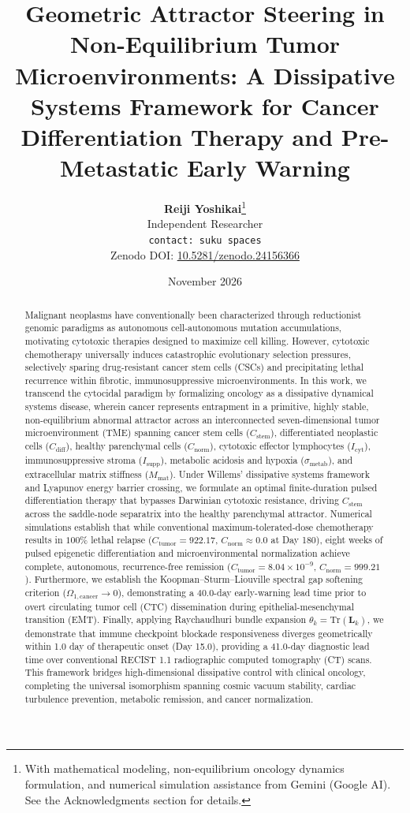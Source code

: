 \documentclass[11pt,a4paper]{article}
\title{\textbf{Geometric Attractor Steering in Non-Equilibrium Tumor Microenvironments: A Dissipative Systems Framework for Cancer Differentiation Therapy and Pre-Metastatic Early Warning}}
\author{
    \textbf{Reiji Yoshikai}\thanks{With mathematical modeling, non-equilibrium oncology dynamics formulation, and numerical simulation assistance from Gemini (Google AI). See the Acknowledgments section for details.} \\
    \small Independent Researcher \\
    \small \texttt{contact: suku spaces} \\
    \small Zenodo DOI: \href{https://doi.org/10.5281/zenodo.24156366}{10.5281/zenodo.24156366}
}
\date{November 2026}
\begin{document}
\maketitle

\begin{abstract}
Malignant neoplasms have conventionally been characterized through reductionist genomic paradigms as autonomous cell-autonomous mutation accumulations, motivating cytotoxic therapies designed to maximize cell killing. However, cytotoxic chemotherapy universally induces catastrophic evolutionary selection pressures, selectively sparing drug-resistant cancer stem cells (CSCs) and precipitating lethal recurrence within fibrotic, immunosuppressive microenvironments. In this work, we transcend the cytocidal paradigm by formalizing oncology as a dissipative dynamical systems disease, wherein cancer represents entrapment in a primitive, highly stable, non-equilibrium abnormal attractor across an interconnected seven-dimensional tumor microenvironment (TME) spanning cancer stem cells ($C_{\mathrm{stem}}$), differentiated neoplastic cells ($C_{\mathrm{diff}}$), healthy parenchymal cells ($C_{\mathrm{norm}}$), cytotoxic effector lymphocytes ($I_{\mathrm{cyt}}$), immunosuppressive stroma ($I_{\mathrm{supp}}$), metabolic acidosis and hypoxia ($\sigma_{\mathrm{metab}}$), and extracellular matrix stiffness ($M_{\mathrm{mat}}$). Under Willems' dissipative systems framework and Lyapunov energy barrier crossing, we formulate an optimal finite-duration pulsed differentiation therapy that bypasses Darwinian cytotoxic resistance, driving $C_{\mathrm{stem}}$ across the saddle-node separatrix into the healthy parenchymal attractor. Numerical simulations establish that while conventional maximum-tolerated-dose chemotherapy results in $100\%$ lethal relapse ($C_{\mathrm{tumor}} = 922.17$, $C_{\mathrm{norm}} \approx 0.0$ at Day 180), eight weeks of pulsed epigenetic differentiation and microenvironmental normalization achieve complete, autonomous, recurrence-free remission ($C_{\mathrm{tumor}} = 8.04 \times 10^{-9}$, $C_{\mathrm{norm}} = 999.21$). Furthermore, we establish the Koopman--Sturm--Liouville spectral gap softening criterion ($\Omega_{1,\mathrm{cancer}} \to 0$), demonstrating a 40.0-day early-warning lead time prior to overt circulating tumor cell (CTC) dissemination during epithelial-mesenchymal transition (EMT). Finally, applying Raychaudhuri bundle expansion $\theta_k = \mathrm{Tr}(\bm{L}_k)$, we demonstrate that immune checkpoint blockade responsiveness diverges geometrically within 1.0 day of therapeutic onset (Day 15.0), providing a 41.0-day diagnostic lead time over conventional RECIST 1.1 radiographic computed tomography (CT) scans. This framework bridges high-dimensional dissipative control with clinical oncology, completing the universal isomorphism spanning cosmic vacuum stability, cardiac turbulence prevention, metabolic remission, and cancer normalization.
\end{abstract}
\end{document}
